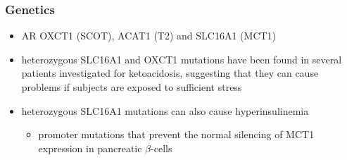 \documentclass[12pt]{scrartcl}
\begin{document}
\subsubsection{Genetics}
\label{sec:org6634136}
\begin{itemize}
\item AR  OXCT1 (SCOT), ACAT1 (T2) and SLC16A1 (MCT1)
\item heterozygous SLC16A1 and OXCT1 mutations have been found in several
patients investigated for ketoacidosis, suggesting that they can
cause problems if subjects are exposed to sufficient stress

\item heterozygous SLC16A1 mutations can also cause hyperinsulinemia
\begin{itemize}
\item promoter mutations that prevent the normal silencing of MCT1
expression in pancreatic \(\beta\)-cells
\end{itemize}
\end{itemize}
\end{document}
